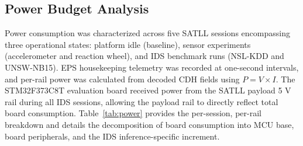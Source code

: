 \subsection{Power Budget Analysis}
\label{sec:res_power}

Power consumption was characterized across five SATLL sessions encompassing three operational states: platform idle (baseline), sensor experiments (accelerometer and reaction wheel), and IDS benchmark runs (NSL-KDD and UNSW-NB15). EPS housekeeping telemetry was recorded at one-second intervals, and per-rail power was calculated from decoded CDH fields using $P = V \times I$. The STM32F373C8T evaluation board received power from the SATLL payload 5 V rail during all IDS sessions, allowing the payload rail to directly reflect total board consumption. Table~\ref{tab:power} provides the per-session, per-rail breakdown and details the decomposition of board consumption into MCU base, board peripherals, and the IDS inference-specific increment.

